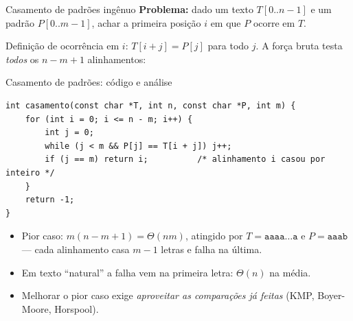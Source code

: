 \documentclass[aspectratio=169]{beamer}
\begin{document}
\begin{frame}{Casamento de padrões ingênuo}
  \textbf{Problema:} dado um texto $T[0..n-1]$ e um padrão $P[0..m-1]$, achar a
  primeira posição $i$ em que $P$ ocorre em $T$.

  \medskip
  Definição de ocorrência em $i$: $T[i+j] = P[j]$ para todo $j$. A força bruta
  testa \emph{todos} os $n-m+1$ alinhamentos:

  \begin{center}
  \end{center}
\end{frame}

\begin{frame}[fragile]{Casamento de padrões: código e análise}
\begin{lstlisting}
int casamento(const char *T, int n, const char *P, int m) {
    for (int i = 0; i <= n - m; i++) {
        int j = 0;
        while (j < m && P[j] == T[i + j]) j++;
        if (j == m) return i;          /* alinhamento i casou por inteiro */
    }
    return -1;
}
\end{lstlisting}

  \begin{itemize}
    \item Pior caso: $m(n-m+1) = \Theta(nm)$, atingido por
      $T = \texttt{aaaa\ldots a}$ e $P = \texttt{aaab}$ --- cada alinhamento casa
      $m-1$ letras e falha na última.
    \item Em texto ``natural'' a falha vem na primeira letra: $\Theta(n)$ na média.
    \item Melhorar o pior caso exige \emph{aproveitar as comparações já feitas}
      (KMP, Boyer-Moore, Horspool).
  \end{itemize}
\end{frame}
\end{document}
